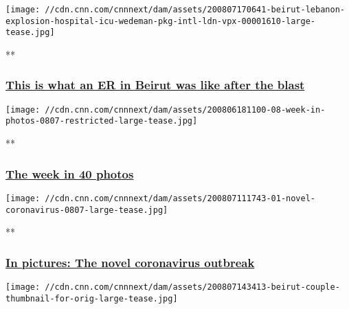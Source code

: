 \texttt{[image: //cdn.cnn.com/cnnnext/dam/assets/200807170641-beirut-lebanon-explosion-hospital-icu-wedeman-pkg-intl-ldn-vpx-00001610-large-tease.jpg]}

**

\hypertarget{this-is-what-an-er-in-beirut-was-like-after-the-blast}{%
\subsubsection{\texorpdfstring{\href{/videos/world/2020/08/07/beirut-lebanon-explosion-hospital-icu-wedeman-pkg-intl-ldn-vpx.cnn}{This
is what an ER in Beirut was like after the
blast}}{This is what an ER in Beirut was like after the blast}}\label{this-is-what-an-er-in-beirut-was-like-after-the-blast}}

\href{/2020/08/06/world/gallery/photos-this-week-july-30-august-6/index.html}{}

\texttt{[image: //cdn.cnn.com/cnnnext/dam/assets/200806181100-08-week-in-photos-0807-restricted-large-tease.jpg]}

**

\hypertarget{the-week-in-40-photos}{%
\subsubsection{\texorpdfstring{\href{/2020/08/06/world/gallery/photos-this-week-july-30-august-6/index.html}{The
week in 40
photos}}{The week in 40 photos}}\label{the-week-in-40-photos}}

\href{/2020/03/19/world/gallery/novel-coronavirus-outbreak/index.html}{}

\texttt{[image: //cdn.cnn.com/cnnnext/dam/assets/200807111743-01-novel-coronavirus-0807-large-tease.jpg]}

**

\hypertarget{in-pictures-the-novel-coronavirus-outbreak}{%
\subsubsection{\texorpdfstring{\href{/2020/03/19/world/gallery/novel-coronavirus-outbreak/index.html}{In
pictures: The novel coronavirus
outbreak}}{In pictures: The novel coronavirus outbreak}}\label{in-pictures-the-novel-coronavirus-outbreak}}

\href{/videos/world/2020/08/07/beirut-explosion-survivors-lon-orig-bks.cnn}{}

\texttt{[image: //cdn.cnn.com/cnnnext/dam/assets/200807143413-beirut-couple-thumbnail-for-orig-large-tease.jpg]}

